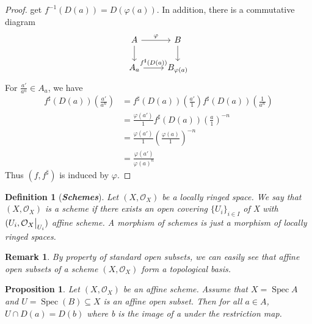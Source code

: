 \documentclass{ctexart}
\newtheorem{definition}{Definition}[section]
\newtheorem{remark}{Remark}[section]
\newtheorem{proposition}{Proposition}[section]
\newcommand{\spec}{\operatorname{Spec}}
\begin{document}
\begin{proof}
    get $f^{-1}(D(a)) = D(\varphi(a))$.
    In addition, there is a commutative diagram
    \begin{equation*}
        \begin{tikzcd}
            A \arrow[r, "\varphi"] \arrow[d] &
            B \arrow[d] \\
            A_{a} \arrow[r, "f^{\sharp}(D(a))"] & 
            B_{\varphi(a)}
        \end{tikzcd}
    \end{equation*}
    For $\frac{a'}{a^{n}}\in A_{a}$, we have
    \begin{equation*}
        \begin{split}
            f^{\sharp}(D(a))(\frac{a'}{a^{n}}) & = f^{\sharp}(D(a))(\frac{a'}{1})f^{\sharp}(D(a))(\frac{1}{a^{n}}) \\
            & = \frac{\varphi(a')}{1}f^{\sharp}(D(a))(\frac{a}{1})^{-n} \\
            & = \frac{\varphi(a')}{1}(\frac{\varphi(a)}{1})^{-n} \\
            & = \frac{\varphi(a')}{\varphi(a)^{n}}
        \end{split}
    \end{equation*}
    Thus $(f, f^{\sharp})$ is induced by $\varphi$.
\end{proof}
\begin{definition}[\textbf{\emph{Schemes}}]
    Let $(X, \mathcal{O}_{X})$ be a locally ringed space.
    We say that $(X, \mathcal{O}_{X})$ is a scheme if there exists an open covering $\{U_{i}\}_{i\in I}$ of X with $(U_{i}, \mathcal{O}_{X}\big{|}_{U_{i}})$ affine scheme.
    A morphism of schemes is just a morphism of locally ringed spaces.
\end{definition}
\begin{remark}
    By property of standard open subsets, we can easily see that affine open subsets of a scheme $(X, \mathcal{O}_{X})$ form a topological basis.
\end{remark}
\begin{proposition}
    Let $(X, \mathcal{O}_{X})$ be an affine scheme.
    Assume that $X = \spec A$ and $U = \spec(B) \subseteq X$ is an affine open subset.
    Then for all $a\in A$, $U \cap D(a) = D(b)$ where b is the image of a under the restriction map.
    \label{Proposition 1.12}
\end{proposition}
\end{document}
